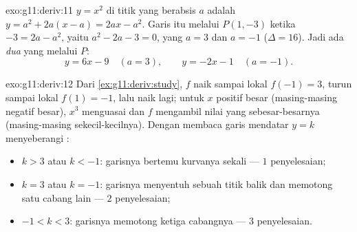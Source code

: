 \begin{solution}{exo:g11:deriv:11}
 $y = x^2$ di titik yang berabsis $a$ adalah
$y = a^2 + 2a(x - a) = 2ax - a^2$. Garis itu melalui $P(1, -3)$ ketika
$-3 = 2a - a^2$, yaitu $a^2 - 2a - 3 = 0$, yang  $a = 3$ dan
$a = -1$ ($\Delta = 16$). Jadi ada \emph{dua}  yang melalui
$P$:
\[
y = 6x - 9 \quad (a = 3),
\qquad
y = -2x - 1 \quad (a = -1).
\]
\end{solution}

\begin{solution}{exo:g11:deriv:12}
Dari \cref{ex:g11:deriv:study}, $f$ naik sampai  lokal
$f(-1) = 3$, turun sampai  lokal $f(1) = -1$, lalu naik
lagi; untuk $x$ positif besar (masing-masing negatif besar), $x^3$ menguasai
dan $f$ mengambil nilai yang sebesar-besarnya (masing-masing sekecil-kecilnya).
Dengan membaca garis mendatar $y = k$ menyeberangi :
\begin{itemize}
  \item $k > 3$ atau $k < -1$: garisnya bertemu kurvanya sekali
        --- $1$ penyelesaian;
  \item $k = 3$ atau $k = -1$: garisnya menyentuh sebuah titik balik dan
        memotong satu cabang lain --- $2$ penyelesaian;
  \item $-1 < k < 3$: garisnya memotong ketiga cabangnya --- $3$
        penyelesaian.
\end{itemize}
\end{solution}

